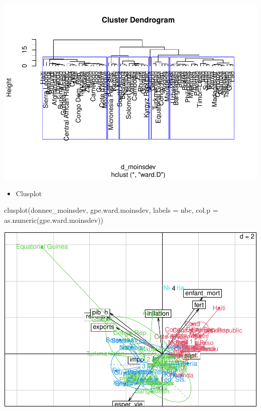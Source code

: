 \documentclass[
]{article}
\newenvironment{Shaded}{}{}
\newcommand{\AttributeTok}[1]{#1}
\newcommand{\FunctionTok}[1]{#1}
\newcommand{\NormalTok}[1]{#1}
\providecommand{\tightlist}{%
  \setlength{\itemsep}{0pt}\setlength{\parskip}{0pt}}
\begin{document}
\includegraphics{Projet_files/figure-latex/unnamed-chunk-36-1.pdf}

\begin{itemize}
\tightlist
\item
  Clusplot
\end{itemize}

\begin{Shaded}
\begin{Highlighting}[]
\FunctionTok{clusplot}\NormalTok{(donnee\_moinsdev, gpe.ward.moinsdev, }\AttributeTok{labels =}\NormalTok{ nbc, }\AttributeTok{col.p =} \FunctionTok{as.numeric}\NormalTok{(gpe.ward.moinsdev))}
\end{Highlighting}
\end{Shaded}

\includegraphics{Projet_files/figure-latex/unnamed-chunk-37-1.pdf}
\end{document}
